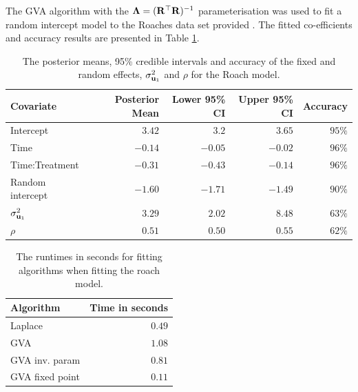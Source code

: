 The GVA algorithm with the ${\boldsymbol \Lambda} = ({\bf R}^\top {\bf R})^{-1}$ parameterisation was used to fit a random
intercept model to the Roaches data set provided \cite{Gelman2007}. The fitted co-efficients and accuracy
results are presented in Table \ref{tab:application_roaches}.
		
		
		
\begin{table}
	\begin{tabular}{|l|rrrr|}
		\hline
		Covariate          & Posterior Mean & Lower 95\% CI & Upper 95\% CI & Accuracy \\
		\hline
		Intercept          & $3.42$						& $3.2$ 					& $3.65$          & $95\%$     \\
		Time               & $-0.14$        & $-0.05$       & $-0.02$       & $96\%$     \\
		Time:Treatment     & $-0.31$        & $-0.43$       & $-0.14$       & $96\%$     \\
		Random intercept   & $-1.60$        & $-1.71$       & $-1.49$       & $90\%$     \\
		$\sigma^2_{{\bf u}_1}$ & $3.29$           & $2.02$          & $8.48$          & $63\%$     \\
		$\rho$             & $0.51$           & $0.50$          & $0.55$          & $62\%$     \\
		\hline
	\end{tabular}
	\caption{The posterior means, 95\% credible intervals and accuracy of the fixed and random
						effects, $\sigma_{{\bf u}_1}^2$ and $\rho$ for the Roach model.}
	\label{tab:application_roaches}
\end{table}

\begin{table}
	\begin{tabular}{|lr|}
	\hline
	Algorithm & Time in seconds \\
	\hline
	Laplace & $0.49$ \\
	GVA & $1.08$ \\
	GVA inv. param & $0.81$ \\
	GVA fixed point & $0.11$ \\
	\hline
	\end{tabular}
	\label{tab:application_roaches_runtime}
	\caption{The runtimes in seconds for fitting algorithms when fitting the roach model.}
\end{table}
		
